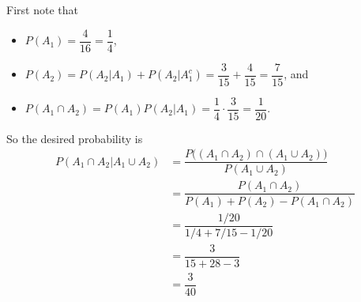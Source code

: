 \documentclass[11pt,fleqn,dvipsnames,usenames]{article}
\begin{document}
\begin{enumerate}
First note that
\begin{itemize}
\item $P(A_{1}) = \dfrac{4}{16} = \dfrac{1}{4}$,
\item $P(A_{2}) = P(A_{2}|A_{1}) + P(A_{2}|A_{1}^{c}) = \dfrac{3}{15} + \dfrac{4}{15} = \dfrac{7}{15}$, and
\item $P(A_{1}\cap A_{2}) = P(A_{1})P(A_{2}|A_{1}) = \dfrac{1}{4}\cdot \dfrac{3}{15} = \dfrac{1}{20}$.
\end{itemize}
So the desired probability is
\begin{align*}
P(A_{1}\cap A_{2}|A_{1}\cup A_{2}) &= \dfrac{P\big((A_{1}\cap A_{2})\cap (A_{1}\cup A_{2})\big)}{P(A_{1}\cup A_{2})}\\
&= \dfrac{P(A_{1}\cap A_{2})}{P(A_{1}) + P(A_{2}) - P(A_{1}\cap A_{2})}\\
&= \dfrac{1/20}{1/4 + 7/15 - 1/20}\\
&= \dfrac{3}{15 + 28 - 3}\\
&= \dfrac{3}{40}
\end{align*}
\end{enumerate}
\end{document}
